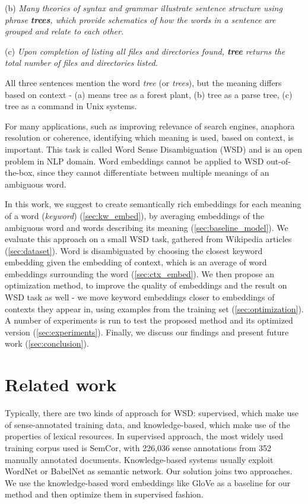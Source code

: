 \documentclass{llncs}
\begin{document}
(b) \textit{Many theories of syntax and grammar illustrate sentence structure using phrase \textbf{trees}, which provide schematics of how the words in a sentence are grouped and relate to each other.}

(c) \textit{Upon completion of listing all files and directories found, \textbf{tree} returns the total number of files and directories listed.}
\medskip

All three sentences mention the word \textit{tree} (or \textit{trees}), but the meaning differs based on context - (a) means tree as a forest plant, (b) tree as a parse tree, (c) tree as a command in Unix systems.

For many applications, such as improving relevance of search engines, anaphora resolution or coherence, identifying which meaning is used, based on context, is important.
This task is called Word Sense Disambiguation (WSD) and is an open problem in NLP domain.
Word embeddings cannot be applied to WSD out-of-the-box, since they cannot differentiate between multiple meanings of an ambiguous word.

In this work, we suggest to create semantically rich embeddings for each meaning of a word (\textit{keyword}) (\ref{sec:kw_embed}), by averaging embeddings of the ambiguous word and words describing its meaning (\ref{sec:baseline_model}).
We evaluate this approach on a small WSD task, gathered from Wikipedia articles (\ref{sec:dataset}).
Word is disambiguated by choosing the closest keyword embedding given the embedding of context, which is an average of word embeddings surrounding the word (\ref{sec:ctx_embed}).
We then propose an optimization method, to improve the quality of embeddings and the result on WSD task as well -  we move keyword embeddings closer to embeddings of contexts they appear in, using examples from the training set (\ref{sec:optimization}).
A number of experiments is run to test the proposed method and its optimized version (\ref{sec:experiments}).
Finally, we discuss our findings and present future work (\ref{sec:conclusion}).

\section{Related work}
\label{related work}

Typically, there are two kinds of approach for WSD: supervised, which make use of sense-annotated training data, and knowledge-based, which make use of the properties of lexical resources. In supervised approach, the most widely used training corpus used is SemCor\cite{semcor}, with 226,036 sense annotations from 352 manually annotated documents.
Knowledge-based systems usually exploit WordNet\cite{wordnet} or BabelNet\cite{babelnet} as semantic network.
Our solution joins two approaches. We use the knowledge-based word embeddings like GloVe\cite{GloVe} as a baseline for our method and then optimize them in supervised fashion.
\end{document}
